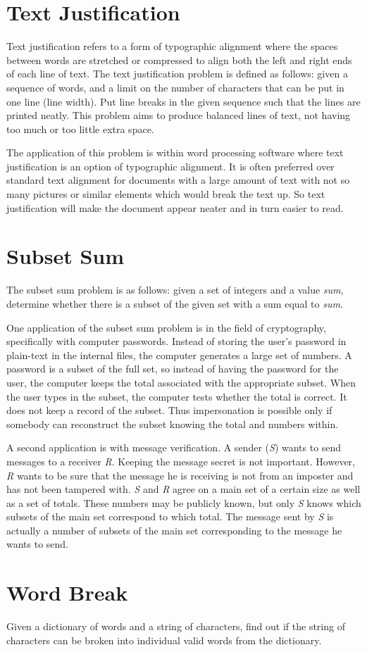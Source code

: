 \section{Text Justification}
Text justification refers to a form of typographic  alignment where the spaces between words are stretched or compressed to align both the left and right ends of each line of text. The text justification problem is defined as follows: given a sequence of words, and a limit on the number of characters that can be put in one line (line width). Put line breaks in the given sequence such that the lines are printed neatly. This problem aims to produce balanced lines of text, not having too much or too little extra space.

The application of this problem is within word processing software where text justification is an option of typographic alignment. It is often preferred over standard text alignment for documents with a large amount of text with not so many pictures or similar elements which would break the text up. So text justification will make the document appear neater and in turn easier to read. 


\section{Subset Sum}
The subset sum problem is as follows: given a set of integers and a value \textit{sum}, determine whether there is a subset of the given set with a sum equal to \textit{sum}.

One application of the subset sum problem is in the field of cryptography, specifically with computer passwords. Instead of storing the user's password in plain-text in the internal files, the computer generates a large set of numbers. A password is a subset of the full set, so instead of having the password for the user, the computer keeps the total associated with the appropriate subset. When the user types in the subset, the computer tests whether the total is correct. It does not keep a record of the subset. Thus impersonation is possible only if somebody can reconstruct the subset knowing the total and numbers within\cite{passwords}.

A second application is with message verification. A sender (\textit{S}) wants to send messages to a receiver \textit{R}. Keeping the message secret is not important. However, \textit{R} wants to be sure that the message he is receiving is not from an imposter and has not been tampered with. \textit{S} and \textit{R} agree on a main set of a certain size as well as a set of totals. These numbers may be publicly known, but only \textit{S} knows which subsets of the main set correspond to which total. The message sent by \textit{S} is actually a number of subsets of the main set corresponding to the message he wants to send\cite{passwords}.


\section{Word Break}
Given a dictionary of words and a string of characters, find out if the string of characters can be broken into individual valid words from the dictionary.


